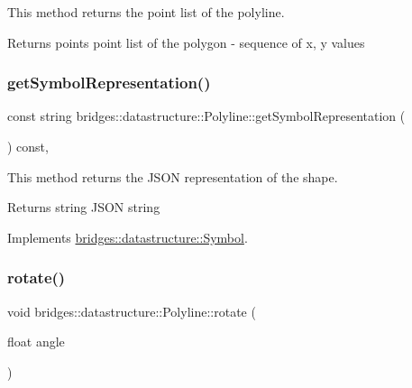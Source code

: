 This method returns the point list of the polyline. 

\begin{DoxyReturn}{Returns}
points point list of the polygon -\/ sequence of x, y values 
\end{DoxyReturn}
\mbox{\label{classbridges_1_1datastructure_1_1_polyline_a176c06400a3b105fa651c69891381201}} 
\subsubsection{\texorpdfstring{get\+Symbol\+Representation()}{getSymbolRepresentation()}}
{\footnotesize\ttfamily const string bridges\+::datastructure\+::\+Polyline\+::get\+Symbol\+Representation (\begin{DoxyParamCaption}{ }\end{DoxyParamCaption}) const\hspace{0.3cm}{\ttfamily [inline]}, {\ttfamily [virtual]}}



This method returns the J\+S\+ON representation of the shape. 

\begin{DoxyReturn}{Returns}
string J\+S\+ON string 
\end{DoxyReturn}


Implements \hyperlink{classbridges_1_1datastructure_1_1_symbol_a8044b3da559dcd9de8510ae339f126c8}{bridges\+::datastructure\+::\+Symbol}.

\mbox{\label{classbridges_1_1datastructure_1_1_polyline_aa61978ccbb0b086dc8f55e90ccca23c9}} 
\subsubsection{\texorpdfstring{rotate()}{rotate()}}
{\footnotesize\ttfamily void bridges\+::datastructure\+::\+Polyline\+::rotate (\begin{DoxyParamCaption}\item[{float}]{angle }\end{DoxyParamCaption})\hspace{0.3cm}{\ttfamily [inline]}}



